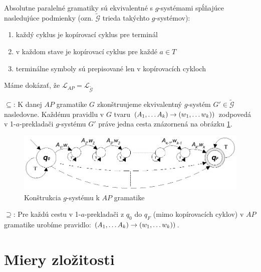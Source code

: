 \begin{veta}
Absolutne paralelné gramatiky sú ekvivalentné s $g$-systémami
spĺňajúce nasledujúce podmienky (ozn. $\tilde{\mathcal{G}}$ trieda
takýchto $g$-systémov):
\begin{enumerate}
  \item každý cyklus je kopírovací cyklus pre terminál
  \item v každom stave je kopírovací cyklus pre každé $a\in T$
  \item terminálne symboly sú prepisované len v kopírovacích cykloch
\end{enumerate}
\end{veta}

\begin{dokaz}
Máme dokázať, že
$\mathcal{L}_{AP}=\mathcal{L}_{\tilde{\mathcal{G}}}$
\begin{description}
\item{$\subseteq$:} K danej $AP$ gramatike $G$ zkonštruujeme ekvivalentný $g$-systém
$G'\in\tilde{\mathcal{G}}$ nasledovne. Každému pravidlu v $G$
tvaru $(A_1,\dots A_k)\rightarrow (w_1,\dots w_k))$ zodpovedá v
1-$a$-prekladači $g$-systému $G'$ práve jedna cesta znázornená na
obrázku \ref{gs_obr_ap}.

\begin{figure}[!ht]
\centering
\includegraphics{img/gsystems/ap}
\caption{Konštrukcia $g$-systému k $AP$ gramatike} \label{gs_obr_ap}
\end{figure}

\item{$\supseteq$:} Pre každú cestu v 1-$a$-prekladači z $q_0$ do $q_F$
(mimo kopírovacích cyklov) v $AP$ gramatike urobíme pravidlo:
$(A_1,\dots A_k)\rightarrow (w_1,\dots w_k))$.
\end{description}
\end{dokaz}

\section{Miery zložitosti}

